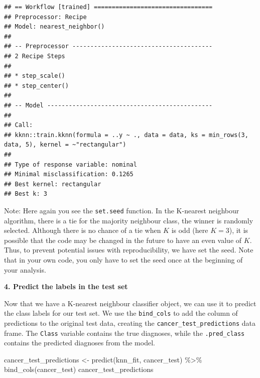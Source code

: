 \documentclass[
]{krantz}
\makeatletter
\newenvironment{Shaded}{\begin{snugshade}}{\end{snugshade}}
\newcommand{\FunctionTok}[1]{\textcolor[rgb]{0,0,0}{#1}}
\newcommand{\NormalTok}[1]{#1}
\newcommand{\OtherTok}[1]{\textcolor[rgb]{0.37,0.37,0.37}{#1}}
\newcommand{\SpecialCharTok}[1]{\textcolor[rgb]{0,0,0}{#1}}
\renewenvironment{quote}{\begin{VF}}{\end{VF}}
\newenvironment{kframe}{%
\medskip{}
\setlength{\fboxsep}{.8em}
 \def\at@end@of@kframe{}%
 \ifinner\ifhmode%
  \def\at@end@of@kframe{\end{minipage}}%
  \begin{minipage}{\columnwidth}%
 \fi\fi%
 \def\FrameCommand##1{\hskip\@totalleftmargin \hskip-\fboxsep
 \colorbox{shadecolor}{##1}\hskip-\fboxsep
     \hskip-\linewidth \hskip-\@totalleftmargin \hskip\columnwidth}%
 \MakeFramed {\advance\hsize-\width
   \@totalleftmargin\z@ \linewidth\hsize
   \@setminipage}}%
 {\par\unskip\endMakeFramed%
 \at@end@of@kframe}
\renewenvironment{Shaded}{\begin{kframe}}{\end{kframe}}
\makeatother
\begin{document}
\begin{verbatim}
## == Workflow [trained] =================================
## Preprocessor: Recipe
## Model: nearest_neighbor()
## 
## -- Preprocessor ---------------------------------------
## 2 Recipe Steps
## 
## * step_scale()
## * step_center()
## 
## -- Model ----------------------------------------------
## 
## Call:
## kknn::train.kknn(formula = ..y ~ ., data = data, ks = min_rows(3,     data, 5), kernel = ~"rectangular")
## 
## Type of response variable: nominal
## Minimal misclassification: 0.1265
## Best kernel: rectangular
## Best k: 3
\end{verbatim}

\begin{quote}
Note: Here again you see the \texttt{set.seed} function. In the K-nearest neighbour algorithm,
there is a tie for the majority neighbour class, the winner is randomly selected. Although there is no chance
of a tie when \(K\) is odd (here \(K=3\)), it is possible that the code may be changed in the future to have an even value of \(K\).
Thus, to prevent potential issues with reproducibility, we have set the seed. Note that in your own code,
you only have to set the seed once at the beginning of your analysis.
\end{quote}

\textbf{4. Predict the labels in the test set}

Now that we have a K-nearest neighbour classifier object, we can use it to
predict the class labels for our test set. We use the \texttt{bind\_cols} to add the
column of predictions to the original test data, creating the
\texttt{cancer\_test\_predictions} data frame. The \texttt{Class} variable contains the true
diagnoses, while the \texttt{.pred\_class} contains the predicted diagnoses from the
model.

\begin{Shaded}
\begin{Highlighting}[]
\NormalTok{cancer\_test\_predictions }\OtherTok{\textless{}{-}} \FunctionTok{predict}\NormalTok{(knn\_fit, cancer\_test) }\SpecialCharTok{\%\textgreater{}\%}
  \FunctionTok{bind\_cols}\NormalTok{(cancer\_test)}
\NormalTok{cancer\_test\_predictions}
\end{Highlighting}
\end{Shaded}
\end{document}
